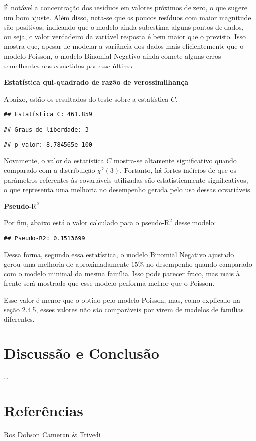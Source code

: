 \documentclass[
]{article}
\begin{document}
É notável a concentração dos resíduos em valores próximos de zero, o que
sugere um bom ajuste. Além disso, nota-se que os poucos resíduos com
maior magnitude são positivos, indicando que o modelo ainda subestima
alguns pontos de dados, ou seja, o valor verdadeiro da variável resposta
é bem maior que o previsto. Isso mostra que, apesar de modelar a
variância dos dados mais eficientemente que o modelo Poisson, o modelo
Binomial Negativo ainda comete alguns erros semelhantes aos cometidos
por esse último.

\textbf{Estatística qui-quadrado de razão de verossimilhança}

Abaixo, estão os resultados do teste sobre a estatística \(C\).

\begin{verbatim}
## Estatística C: 461.859
\end{verbatim}

\begin{verbatim}
## Graus de liberdade: 3
\end{verbatim}

\begin{verbatim}
## p-valor: 8.784565e-100
\end{verbatim}

Novamente, o valor da estatística \(C\) mostra-se altamente
significativo quando comparado com a distribuição \(\chi^2(3)\).
Portanto, há fortes indícios de que os parâmetros referentes às
covariáveis utilizadas são estatisticamente significativos, o que
representa uma melhoria no desempenho gerada pelo uso dessas
covariáveis.

\textbf{Pseudo-\(\text{R}^2\)}

Por fim, abaixo está o valor calculado para o pseudo-\(\text{R}^2\)
desse modelo:

\begin{verbatim}
## Pseudo-R2: 0.1513699
\end{verbatim}

Dessa forma, segundo essa estatística, o modelo Binomial Negativo
ajustado gerou uma melhoria de aproximadamente \(15\%\) no desempenho
quando comparado com o modelo minimal da mesma família. Isso pode
parecer fraco, mas mais à frente será mostrado que esse modelo performa
melhor que o Poisson.

Esse valor é menor que o obtido pelo modelo Poisson, mas, como explicado
na seção 2.4.5, esses valores não são comparáveis por virem de modelos
de famílias diferentes.

\section{Discussão e Conclusão}\label{discussuxe3o-e-conclusuxe3o}

\ldots{}

\section{Referências}\label{referuxeancias}

Ros Dobson Cameron \& Trivedi
\end{document}
